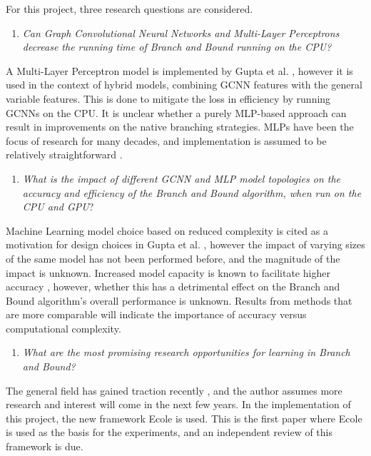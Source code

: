 For this project, three research questions are considered.
%
\begin{enumerate}[label=(\roman*)]
    \item \textit{Can Graph Convolutional Neural Networks and  Multi-Layer Perceptrons decrease the running time of Branch and Bound running on the \Gls{CPU}?}
\end{enumerate}
%
A Multi-Layer Perceptron model is implemented by Gupta et al. \cite{gupta2020hybrid}, however it is used in the context of hybrid models, combining \Gls{GCNN} features with the general variable features. This is done to mitigate the loss in efficiency by running \gls{GCNN}s on the \gls{CPU}. It is unclear whether a purely \gls{MLP}-based approach can result in improvements on the native branching strategies. \gls{MLP}s have been the focus of research for many decades, and implementation is assumed to be relatively straightforward \cite{goodfellow2016deep}.
%
\begin{enumerate}[resume*]
    \item \textit{What is the impact of different \gls{GCNN} and \gls{MLP} model topologies on the accuracy and efficiency of the Branch and Bound algorithm, when run on the \gls{CPU} and \gls{GPU}}?
\end{enumerate}
%
Machine Learning model choice based on reduced complexity is cited as a motivation for design choices in Gupta et al. \cite{gupta2020hybrid}, however the impact of varying sizes of the same model has not been performed before, and the magnitude of the impact is unknown. Increased model capacity is known to facilitate higher accuracy \cite{goodfellow2016deep}, however, whether this has a detrimental effect on the Branch and Bound algorithm's overall performance is unknown. Results from methods that are more comparable will indicate the importance of accuracy versus computational complexity.   
%
\begin{enumerate}[resume*]
    \item \textit{What are the most promising research opportunities for learning in Branch and Bound?}
\end{enumerate}
%
The general field has gained traction recently \cite{bengio2020machine}, and the author assumes more research and interest will come in the next few years. In the implementation of this project, the new framework \gls{Ecole} is used. This is the first paper where \gls{Ecole} is used as the basis for the experiments, and an independent review of this framework is due.  



